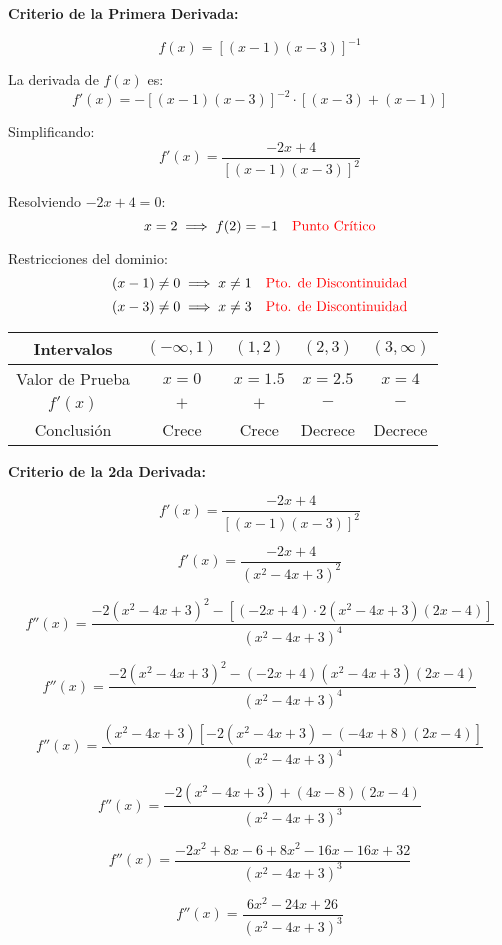 \textbf{Criterio de la Primera Derivada:}  

\[
f(x) = [(x - 1)(x - 3)]^{-1}
\]

La derivada de \( f(x) \) es:
\[
f'(x) = -[(x - 1)(x - 3)]^{-2} \cdot [(x - 3) + (x - 1)]
\]

Simplificando:
\[
f'(x) = \frac{-2x + 4}{[(x - 1)(x - 3)]^2}
\]

Resolviendo \( -2x + 4 = 0 \):  
\[
x = 2 \implies f(2) = -1 \quad \textcolor{red}{\text{Punto Crítico}}
\]

Restricciones del dominio:
\[
(x - 1) \neq 0 \implies x \neq 1 \quad \textcolor{red}{\text{Pto. de Discontinuidad}}
\]
\[
(x - 3) \neq 0 \implies x \neq 3 \quad \textcolor{red}{\text{Pto. de Discontinuidad}}
\]


\begin{center}
    \begin{tabular}{|c|c|c|c|c|}
        \hline
        Intervalos & $(-\infty,1)$ & $(1,2)$ & $(2,3)$ & $(3,\infty)$ \\
        \hline
        Valor de Prueba & $x=0$ & $x=1.5$ & $x=2.5$ & $x=4$ \\
        \hline
        $f'(x)$ & $+$ & $+$ & $-$ & $-$ \\
        \hline
        Conclusión & Crece & Crece & Decrece & Decrece \\
        \hline
    \end{tabular}
\end{center}


\textbf{Criterio de la 2da Derivada:}

\[
f'(x) = \frac{-2x + 4}{[ (x - 1)(x - 3) ]^2}
\]

\[
f'(x) = \frac{-2x + 4}{(x^2 - 4x + 3)^2}
\]

\[
f''(x) = \frac{-2 (x^2 - 4x + 3)^2 - [ (-2x + 4) \cdot 2 (x^2 - 4x + 3) (2x - 4) ]}{(x^2 - 4x + 3)^4}
\]

\[
f''(x) = \frac{-2 (x^2 - 4x + 3)^2 - (-2x + 4) (x^2 - 4x + 3) (2x - 4)}{(x^2 - 4x + 3)^4}
\]

\[
f''(x) = \frac{(x^2 - 4x + 3) \left[ -2 (x^2 - 4x + 3) - (-4x + 8) (2x - 4) \right]}{(x^2 - 4x + 3)^4}
\]

\[
f''(x) = \frac{-2 (x^2 - 4x + 3) + (4x - 8) (2x - 4)}{(x^2 - 4x + 3)^3}
\]

\[
f''(x) = \frac{-2x^2 + 8x - 6 + 8x^2 - 16x - 16x + 32}{(x^2 - 4x + 3)^3}
\]

\[
f''(x) = \frac{6x^2 - 24x + 26}{(x^2 - 4x + 3)^3}
\]

